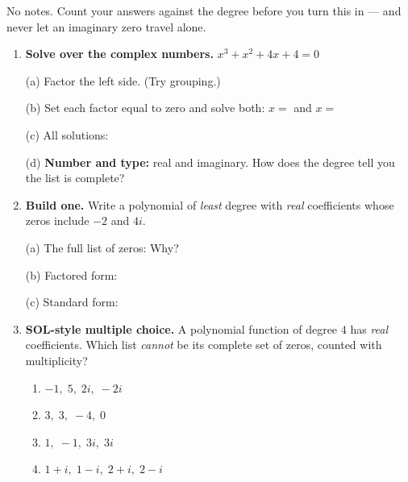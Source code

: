 \documentclass[10pt]{article}
\begin{document}
\namedateperiod

\vspace{0.10in}

No notes. Count your answers against the degree before you turn this in --- and never let an
imaginary zero travel alone.

\begin{enumerate}[leftmargin=1.8em, itemsep=12pt]
  \item \textbf{Solve over the complex numbers.} $x^3 + x^2 + 4x + 4 = 0$

    \vspace{3pt}
    (a) Factor the left side. (Try grouping.) \blank{6.0cm}

    \vspace{3pt}
    (b) Set each factor equal to zero and solve both: $x = $ \blank{1.2cm} \quad and \quad
    $x = $ \blank{2.6cm}

    \vspace{3pt}
    (c) All solutions: \blank{5.0cm}

    \vspace{3pt}
    (d) \textbf{Number and type:} \blank{1.0cm} real and \blank{1.0cm} imaginary. How does the
    degree tell you the list is complete? \blank{5.4cm}

  \item \textbf{Build one.} Write a polynomial of \emph{least} degree with \emph{real} coefficients
    whose zeros include $-2$ and $4i$.

    \vspace{3pt}
    (a) The full list of zeros: \blank{4.0cm} \quad Why? \blank{4.6cm}

    \vspace{3pt}
    (b) Factored form: \blank{4.6cm}

    \vspace{3pt}
    (c) Standard form: \blank{6.0cm}

  \item \textbf{SOL-style multiple choice.} A polynomial function of degree $4$ has \emph{real}
    coefficients. Which list \emph{cannot} be its complete set of zeros, counted with multiplicity?
    \begin{enumerate}[label=\Alph*., leftmargin=1.9em, itemsep=1pt]
      \item $-1,\; 5,\; 2i,\; -2i$
      \item $3,\; 3,\; -4,\; 0$
      \item $1,\; -1,\; 3i,\; 3i$
      \item $1+i,\; 1-i,\; 2+i,\; 2-i$
    \end{enumerate}
\end{enumerate}
\end{document}
